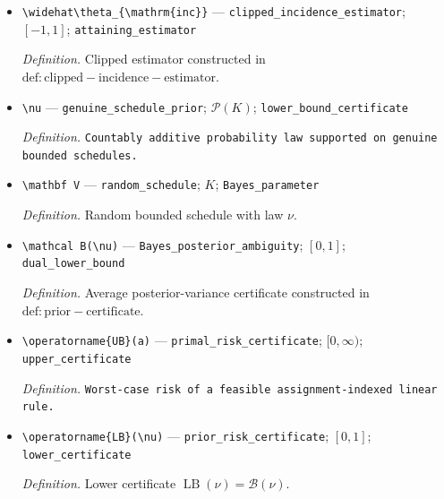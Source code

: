 \documentclass{article}
\begin{document}
\begin{itemize}
  \par\smallskip\noindent\emph{Definition.} Projection \(\operatorname{clip}(t)=\max\{-1,\min\{1,t\}\}\).
  \item \texttt{\textbackslash{}\allowbreak{}widehat\textbackslash{}\allowbreak{}theta\_\allowbreak{}\{\textbackslash{}\allowbreak{}mathrm\{inc\}\allowbreak{}\}\allowbreak{}} --- \texttt{clipped\_\allowbreak{}incidence\_\allowbreak{}estimator}; \([-1,1]\); \texttt{attaining\_\allowbreak{}estimator}
  \par\smallskip\noindent\emph{Definition.} Clipped estimator constructed in \(\mathrm{def:clipped-incidence-estimator}\).
  \item \texttt{\textbackslash{}\allowbreak{}nu} --- \texttt{genuine\_\allowbreak{}schedule\_\allowbreak{}prior}; \(\mathcal P(K)\); \texttt{lower\_\allowbreak{}bound\_\allowbreak{}certificate}
  \par\smallskip\noindent\emph{Definition.} \texttt{Countably additive probability law supported on genuine bounded schedules.}
  \item \texttt{\textbackslash{}\allowbreak{}mathbf V} --- \texttt{random\_\allowbreak{}schedule}; \(K\); \texttt{Bayes\_\allowbreak{}parameter}
  \par\smallskip\noindent\emph{Definition.} Random bounded schedule with law \(\nu\).
  \item \texttt{\textbackslash{}\allowbreak{}mathcal B(\textbackslash{}\allowbreak{}nu)} --- \texttt{Bayes\_\allowbreak{}posterior\_\allowbreak{}ambiguity}; \([0,1]\); \texttt{dual\_\allowbreak{}lower\_\allowbreak{}bound}
  \par\smallskip\noindent\emph{Definition.} Average posterior-variance certificate constructed in \(\mathrm{def:prior-certificate}\).
  \item \texttt{\textbackslash{}\allowbreak{}operatorname\{UB\}\allowbreak{}(a)} --- \texttt{primal\_\allowbreak{}risk\_\allowbreak{}certificate}; \([0,\infty)\); \texttt{upper\_\allowbreak{}certificate}
  \par\smallskip\noindent\emph{Definition.} \texttt{Worst-\allowbreak{}case risk of a feasible assignment-\allowbreak{}indexed linear rule.}
  \item \texttt{\textbackslash{}\allowbreak{}operatorname\{LB\}\allowbreak{}(\textbackslash{}\allowbreak{}nu)} --- \texttt{prior\_\allowbreak{}risk\_\allowbreak{}certificate}; \([0,1]\); \texttt{lower\_\allowbreak{}certificate}
  \par\smallskip\noindent\emph{Definition.} Lower certificate \(\operatorname{LB}(\nu)=\mathcal B(\nu)\).

\end{itemize}
\end{document}
